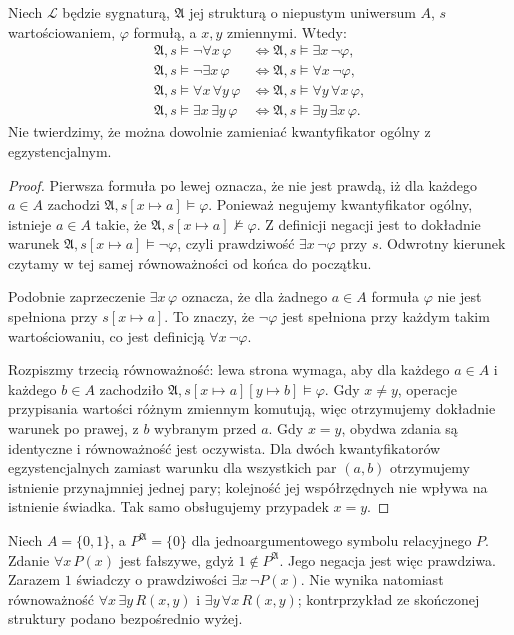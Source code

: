 \begin{twierdzenie}
\label{thm:sem-quantifier-laws-xlv}
Niech $\mathcal L$ będzie sygnaturą, $\mathfrak A$ jej
strukturą o niepustym uniwersum $A$, $s$ wartościowaniem,
$\varphi$ formułą, a $x,y$ zmiennymi. Wtedy:
\begin{align*}
\mathfrak A,s\models\neg\forall x\,\varphi
 &\iff\mathfrak A,s\models\exists x\,\neg\varphi,\\
\mathfrak A,s\models\neg\exists x\,\varphi
 &\iff\mathfrak A,s\models\forall x\,\neg\varphi,\\
\mathfrak A,s\models\forall x\,\forall y\,\varphi
 &\iff\mathfrak A,s\models\forall y\,\forall x\,\varphi,\\
\mathfrak A,s\models\exists x\,\exists y\,\varphi
 &\iff\mathfrak A,s\models\exists y\,\exists x\,\varphi.
\end{align*}
Nie twierdzimy, że można dowolnie zamieniać
kwantyfikator ogólny z egzystencjalnym.
\end{twierdzenie}
\begin{proof}
Pierwsza formuła po lewej oznacza, że nie jest prawdą,
iż dla każdego $a\in A$ zachodzi
$\mathfrak A,s[x\mapsto a]\models\varphi$.
Ponieważ negujemy kwantyfikator ogólny, istnieje
$a\in A$ takie, że
$\mathfrak A,s[x\mapsto a]\not\models\varphi$.
Z definicji negacji jest to dokładnie warunek
$\mathfrak A,s[x\mapsto a]\models\neg\varphi$,
czyli prawdziwość $\exists x\,\neg\varphi$ przy $s$.
Odwrotny kierunek czytamy w tej samej równoważności
od końca do początku.

Podobnie zaprzeczenie $\exists x\,\varphi$ oznacza,
że dla żadnego $a\in A$ formuła $\varphi$ nie jest
spełniona przy $s[x\mapsto a]$. To znaczy, że
$\neg\varphi$ jest spełniona przy każdym takim
wartościowaniu, co jest definicją $\forall x\,\neg\varphi$.

Rozpiszmy trzecią równoważność: lewa strona wymaga,
aby dla każdego $a\in A$ i każdego $b\in A$ zachodziło
$\mathfrak A,s[x\mapsto a][y\mapsto b]\models\varphi$.
Gdy $x\ne y$, operacje przypisania wartości różnym
zmiennym komutują, więc otrzymujemy dokładnie warunek
po prawej, z $b$ wybranym przed $a$. Gdy $x=y$,
obydwa zdania są identyczne i równoważność jest oczywista.
Dla dwóch kwantyfikatorów egzystencjalnych zamiast
warunku dla wszystkich par $(a,b)$ otrzymujemy istnienie
przynajmniej jednej pary; kolejność jej współrzędnych
nie wpływa na istnienie świadka. Tak samo obsługujemy
przypadek $x=y$.
\end{proof}
\begin{przyklad}
Niech $A=\{0,1\}$, a $P^{\mathfrak A}=\{0\}$ dla
jednoargumentowego symbolu relacyjnego $P$.
Zdanie $\forall x\,P(x)$ jest fałszywe, gdyż
$1\notin P^{\mathfrak A}$. Jego negacja jest więc
prawdziwa. Zarazem $1$ świadczy o prawdziwości
$\exists x\,\neg P(x)$.
Nie wynika natomiast równoważność
$\forall x\,\exists y\,R(x,y)$ i
$\exists y\,\forall x\,R(x,y)$; kontrprzykład
ze skończonej struktury podano bezpośrednio wyżej.
\end{przyklad}

